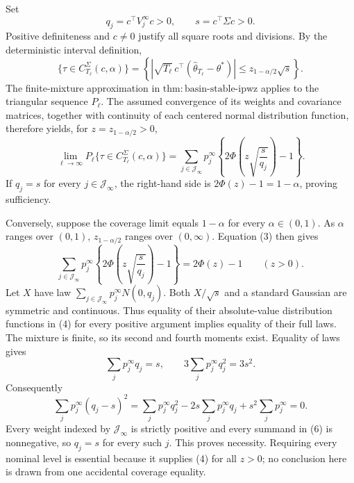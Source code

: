 Set
\[
 q_j=c^\top V_j^\infty c>0,
 \qquad s=c^\top\Sigma c>0. \tag{1}
\]
Positive definiteness and \(c\ne0\) justify all square roots and divisions. By the deterministic interval definition,
\[
 \{\tau\in C_{T_\ell}^{\Sigma}(c,\alpha)\}
 =\left\{\left|\sqrt{T_\ell}\,c^\top(\widehat\theta_{T_\ell}-\theta^*)\right|
 \le z_{1-\alpha/2}\sqrt s\right\}. \tag{2}
\]
The finite-mixture approximation in \(\mathrm{thm:basin\text{-}stable\text{-}ipwz}\) applies to the triangular sequence \(P_\ell\). The assumed convergence of its weights and covariance matrices, together with continuity of each centered normal distribution function, therefore yields, for \(z=z_{1-\alpha/2}>0\),
\[
 \lim_{\ell\to\infty}P_\ell\{\tau\in C_{T_\ell}^{\Sigma}(c,\alpha)\}
 =\sum_{j\in\mathcal J_\infty}p_j^\infty
 \left\{2\Phi\left(z\sqrt{\frac{s}{q_j}}\right)-1\right\}. \tag{3}
\]
If \(q_j=s\) for every \(j\in\mathcal J_\infty\), the right-hand side is \(2\Phi(z)-1=1-\alpha\), proving sufficiency.

Conversely, suppose the coverage limit equals \(1-\alpha\) for every \(\alpha\in(0,1)\). As \(\alpha\) ranges over \((0,1)\), \(z_{1-\alpha/2}\) ranges over \((0,\infty)\). Equation (3) then gives
\[
 \sum_{j\in\mathcal J_\infty}p_j^\infty
 \left\{2\Phi\left(z\sqrt{\frac{s}{q_j}}\right)-1\right\}
 =2\Phi(z)-1 \qquad(z>0). \tag{4}
\]
Let \(X\) have law \(\sum_{j\in\mathcal J_\infty}p_j^\infty N(0,q_j)\). Both \(X/\sqrt s\) and a standard Gaussian are symmetric and continuous. Thus equality of their absolute-value distribution functions in (4) for every positive argument implies equality of their full laws. The mixture is finite, so its second and fourth moments exist. Equality of laws gives
\[
 \sum_jp_j^\infty q_j=s,
 \qquad 3\sum_jp_j^\infty q_j^2=3s^2. \tag{5}
\]
Consequently
\[
 \sum_jp_j^\infty(q_j-s)^2
 =\sum_jp_j^\infty q_j^2-2s\sum_jp_j^\infty q_j
 +s^2\sum_jp_j^\infty=0. \tag{6}
\]
Every weight indexed by \(\mathcal J_\infty\) is strictly positive and every summand in (6) is nonnegative, so \(q_j=s\) for every such \(j\). This proves necessity. Requiring every nominal level is essential because it supplies (4) for all \(z>0\); no conclusion here is drawn from one accidental coverage equality.